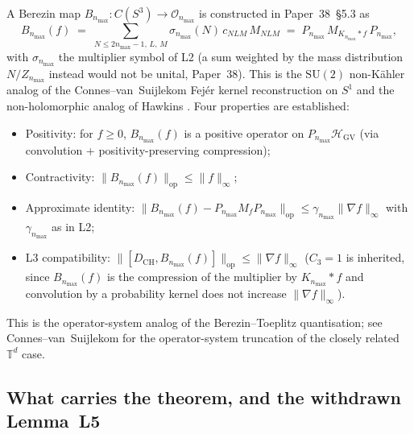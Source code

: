 \documentclass[11pt,a4paper]{article}
\theoremstyle{plain}
\theoremstyle{definition}
\newcommand{\nmax}{n_{\max}}
\newcommand{\sthree}{S^{3}}
\newcommand{\HGV}{\mathcal{H}_{\mathrm{GV}}}
\newcommand{\DCH}{D_{\mathrm{CH}}}
\newcommand{\Op}{\mathcal{O}}
\newcommand{\opnorm}[1]{\lVert #1 \rVert_{\mathrm{op}}}
\newcommand{\norm}[1]{\lVert #1 \rVert}
\newcommand{\T}{\mathbb{T}}
\newcommand{\SU}{\mathrm{SU}}
\newcommand{\Mat}{M}
\begin{document}
A Berezin map $B_{\nmax}: C(\sthree) \to \Op_{\nmax}$ is constructed
in Paper~38~\S 5.3 as
\begin{equation}
B_{\nmax}(f) \;=\; \sum_{N \le 2\nmax - 1,\,L,\,M}
\sigma_{\nmax}(N)\, c_{NLM}\, \Mat_{NLM}
\;=\; P_{\nmax}\, \Mat_{K_{\nmax} \ast f}\, P_{\nmax},
\label{eq:berezin}
\end{equation}
with $\sigma_{\nmax}$ the multiplier symbol of L2 (a sum weighted by the
mass distribution $N/Z_{\nmax}$ instead would not be unital, Paper~38).
This is the $\SU(2)$ non-K\"ahler analog of the Connes--van~Suijlekom
\cite{connes_vs2021} Fej\'er kernel reconstruction on $S^{1}$ and the
non-holomorphic analog of Hawkins \cite{hawkins2000}.  Four properties
are established:
\begin{itemize}\setlength\itemsep{0pt}
\item[(a)] Positivity: for $f \ge 0$, $B_{\nmax}(f)$ is a positive
operator on $P_{\nmax}\HGV$ (via convolution + positivity-preserving
compression);
\item[(b)] Contractivity: $\opnorm{B_{\nmax}(f)} \le \norm{f}_{\infty}$;
\item[(c)] Approximate identity: $\opnorm{B_{\nmax}(f) - P_{\nmax}
M_{f} P_{\nmax}} \le \gamma_{\nmax} \norm{\nabla f}_{\infty}$ with
$\gamma_{\nmax}$ as in L2;
\item[(d)] L3 compatibility: $\opnorm{[\DCH, B_{\nmax}(f)]} \le
\norm{\nabla f}_{\infty}$ ($C_{3} = 1$ is inherited, since $B_{\nmax}(f)$
is the compression of the multiplier by $K_{\nmax} \ast f$ and convolution
by a probability kernel does not increase $\norm{\nabla f}_{\infty}$).
\end{itemize}
This is the operator-system analog of the Berezin--Toeplitz
quantisation; see Connes--van~Suijlekom \cite{connes_vs2021}
for the operator-system truncation of the closely related $\T^{d}$ case.

\subsection{What carries the theorem, and the withdrawn Lemma~L5}
\label{sec:l5_withdrawn}
\end{document}
